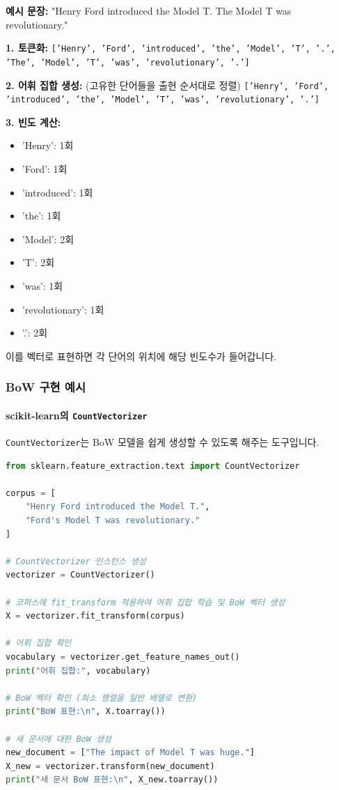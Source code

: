 \documentclass[11pt,a4paper]{article}
\theoremstyle{definition}
\begin{document}
\begin{tcolorbox}[examplebox, title=\textbf{예시}]
\textbf{예시 문장:} "Henry Ford introduced the Model T. The Model T was revolutionary."

\textbf{1. 토큰화:}
\texttt{['Henry', 'Ford', 'introduced', 'the', 'Model', 'T', '.', 'The', 'Model', 'T', 'was', 'revolutionary', '.']}

\textbf{2. 어휘 집합 생성:} (고유한 단어들을 출현 순서대로 정렬)
\texttt{['Henry', 'Ford', 'introduced', 'the', 'Model', 'T', 'was', 'revolutionary', '.']}

\textbf{3. 빈도 계산:}
\begin{itemize}
    \item 'Henry': 1회
    \item 'Ford': 1회
    \item 'introduced': 1회
    \item 'the': 1회
    \item 'Model': 2회
    \item 'T': 2회
    \item 'was': 1회
    \item 'revolutionary': 1회
    \item '.': 2회
\end{itemize}
이를 벡터로 표현하면 각 단어의 위치에 해당 빈도수가 들어갑니다.
\end{tcolorbox}

\subsubsection{BoW 구현 예시}

\paragraph{scikit-learn의 \texttt{CountVectorizer}}
\texttt{CountVectorizer}는 BoW 모델을 쉽게 생성할 수 있도록 해주는 도구입니다.

\begin{lstlisting}[language=Python, caption={scikit-learn CountVectorizer를 이용한 BoW 생성}, label=lst:sklearn_bow]
from sklearn.feature_extraction.text import CountVectorizer

corpus = [
    "Henry Ford introduced the Model T.",
    "Ford's Model T was revolutionary."
]

# CountVectorizer 인스턴스 생성
vectorizer = CountVectorizer()

# 코퍼스에 fit_transform 적용하여 어휘 집합 학습 및 BoW 벡터 생성
X = vectorizer.fit_transform(corpus)

# 어휘 집합 확인
vocabulary = vectorizer.get_feature_names_out()
print("어휘 집합:", vocabulary)

# BoW 벡터 확인 (희소 행렬을 일반 배열로 변환)
print("BoW 표현:\n", X.toarray())

# 새 문서에 대한 BoW 생성
new_document = ["The impact of Model T was huge."]
X_new = vectorizer.transform(new_document)
print("새 문서 BoW 표현:\n", X_new.toarray())
\end{lstlisting}
\end{document}
